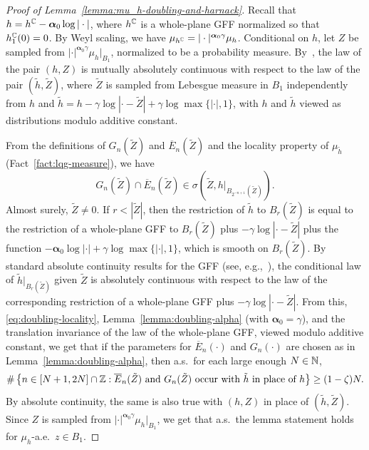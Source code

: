\documentclass[12pt]{amsart}
\numberwithin{equation}{section}
\begin{document}
	
	
	\begin{proof}[Proof of Lemma~\ref{lemma:mu_h-doubling-and-harnack}]
		Recall that $h = h^{\mathbb{C}} - \boldsymbol{\alpha}_0 \log|\cdot|$, where $h^{\mathbb{C}}$ is a whole-plane GFF normalized so that $h^{\mathbb{C}}_1(0) = 0$. 
		By Weyl scaling, we have $\mu_{h^{\mathbb{C}}} = |\cdot|^{\boldsymbol{\alpha}_0 \gamma} \mu_h$. 
		Conditional on $h$, let $Z$ be sampled from $|\cdot|^{\boldsymbol{\alpha}_0 \gamma} \mu_{h}|_{B_1}$, normalized to be a probability measure. 
		By~\cite[Lemma A.10]{duplantier2014liouville}, the law of the pair $(h, Z)$ is mutually absolutely continuous with respect to the law of the pair $(\tilde h , \tilde Z)$, where $\tilde Z$ is sampled from Lebesgue measure in $B_1$ independently from $h$ and $\tilde h = h  - \gamma\log|\cdot-\tilde Z|  + \gamma \log \max\{|\cdot|,1\}$, with $h$ and $\tilde h$ viewed as distributions modulo additive constant. 
		
		From the definitions of $G_n(\tilde Z)$ and $\overline E_n(\tilde Z)$ and the locality property of $\mu_{\tilde h}$ (Fact~\ref{fact:lqg-measure}), we have 
		\begin{equation} \label{eq:doubling-locality}
		G_n(\tilde Z) \cap \overline E_n(\tilde Z) \in \sigma\left( \tilde Z  , h |_{B_{2^{-n+1}}(\tilde Z)} \right).
		\end{equation}
		Almost surely, $\tilde Z \not= 0$. If $r < |\tilde Z|$, then the restriction of $\tilde h$ to $B_r(\tilde Z)$ is equal to the restriction of a whole-plane GFF to $B_r(\tilde Z)$ plus $- \gamma\log|\cdot-\tilde Z|$ plus the function $-\boldsymbol{\alpha}_0 \log|\cdot|  + \gamma \log\max\{|\cdot|,1\}$, which is smooth on $B_r(\tilde Z)$. By standard absolute continuity results for the GFF (see, e.g.,~\cite[Proposition 2.9]{miller2017imaginary}), the conditional law of $\tilde h|_{B_r(\tilde Z)}$ given $\tilde Z$ is absolutely continuous with respect  to the law of the corresponding restriction of a whole-plane GFF plus $-\gamma\log|\cdot-\tilde Z|$.  
		From this, \eqref{eq:doubling-locality}, Lemma~\ref{lemma:doubling-alpha} (with $\boldsymbol{\alpha}_0 =\gamma$), and the translation invariance of the law of the whole-plane GFF, viewed modulo additive constant, we get that if the parameters for $\overline E_n(\cdot)$ and  $G_{n}(\cdot)$ are chosen as in Lemma~\ref{lemma:doubling-alpha}, then a.s.\ for each large enough $N\in\mathbb{N}$, 
		\begin{equation} \label{eq:mu_h-doubling-reweight}
		\#\left\{ n \in [N+1,2N] \cap \mathbb{Z}  : \mbox{$\overline E_{n}(\tilde Z)$ and $G_{n}(\tilde Z)$ occur with $\tilde h$ in place of $h$} \right\}  \geq (1-\zeta) N.
		\end{equation}  
		By absolute continuity, the same is also true with $(h,Z)$ in place of $(\tilde h , \tilde Z)$. Since $Z$ is sampled from $|\cdot|^{\boldsymbol{\alpha}_0 \gamma} \mu_{h}|_{B_1}$, we get that a.s.\ the lemma statement holds for $\mu_h$-a.e.\ $z\in B_1$. 
	\end{proof}
	
\end{document}
